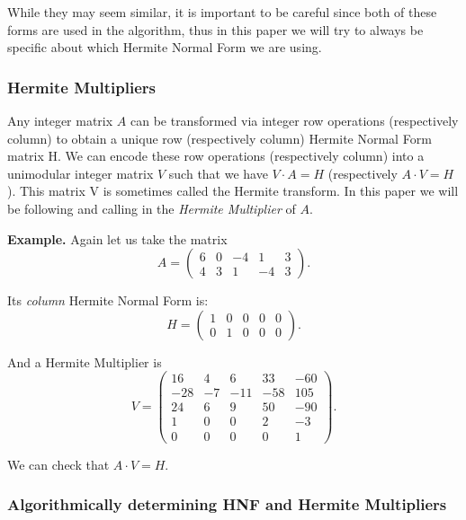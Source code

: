 \documentclass[oneside, a4paper, onecolumn, 11pt]{article}
\newenvironment{example}[1][Example]{\textbf{#1.} }{\medskip}
\begin{document}
While they may seem similar, it is important to be careful since both of these forms are used in the algorithm, thus in this paper we will try to always be specific about which Hermite Normal Form we are using.

\subsubsection{Hermite Multipliers}

Any integer matrix \(A\) can be transformed via integer row operations (respectively column) to obtain a unique row (respectively column) Hermite Normal Form matrix H. We can encode these row operations (respectively column) into a unimodular integer matrix \(V\) such that we have \(V \cdot A = H\) (respectively \(A \cdot V = H\)). This matrix V is sometimes called the Hermite transform. In this paper we will be following \cite{Hubert2013} and calling in the \textit{Hermite Multiplier} of \(A\).

\begin{example}
    Again let us take the matrix
    \[
        A = \begin{pmatrix}
            6 & 0 & -4 & 1  & 3 \\
            4 & 3 & 1  & -4 & 3
        \end{pmatrix}.
    \]

    Its \textit{column} Hermite Normal Form is:
    \[
        H = \begin{pmatrix}
            1 & 0 & 0 & 0 & 0 \\
            0 & 1 & 0 & 0 & 0
        \end{pmatrix}.
    \]

    And a Hermite Multiplier is
    \[
        V = \begin{pmatrix}
            16  & 4  & 6   & 33  & -60 \\
            -28 & -7 & -11 & -58 & 105 \\
            24  & 6  & 9   & 50  & -90 \\
            1   & 0  & 0   & 2   & -3  \\
            0   & 0  & 0   & 0   & 1
        \end{pmatrix}.
    \]

    We can check that \(A \cdot V = H\).
\end{example}


\subsubsection{Algorithmically determining HNF and Hermite Multipliers} \label{algo-hnf}
\end{document}
